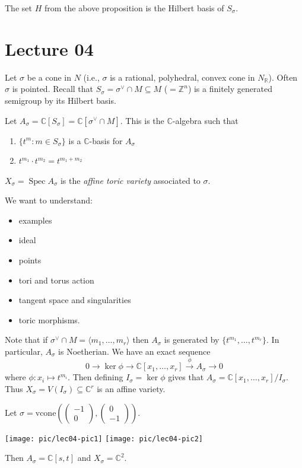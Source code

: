\documentclass[a4paper,12pt]{amsart}
\newcommand{\CC}{\mathbb{C}}
\DeclareMathOperator{\Spec}{Spec}
\begin{document}
The set $H$ from the above proposition is the Hilbert basis of $S_\sigma$.

\newpage
\section{Lecture 04}

Let $\sigma$ be a cone in $N$ (i.e., $\sigma$ is a rational, polyhedral, convex cone in $N_\mathbb{R}$).
Often $\sigma$ is pointed.
Recall that $S_\sigma = \sigma^\vee \cap M \subseteq M$ ($= \mathbb{Z}^n$) is a finitely generated semigroup by its Hilbert basis.

\begin{Def}
Let $A_\sigma = \CC[S_\sigma] = \CC[\sigma^\vee \cap M]$.
This is the $\CC$-algebra such that
\begin{enumerate}
\item $\{t^m : m \in S_\sigma\}$ is a $\CC$-basis for $A_\sigma$
\item $t^{m_1} \cdot t^{m_2} = t^{m_1 + m_2}$
\end{enumerate}
\end{Def}

\begin{Def}
$X_\sigma = \Spec A_\sigma$ is the \emph{affine toric variety} associated to $\sigma$.
\end{Def}

We want to understand:
\begin{itemize}
\item examples
\item ideal
\item points
\item tori and torus action
\item tangent space and singularities
\item toric morphisms.
\end{itemize}

Note that if $\sigma^\vee \cap M = \langle m_1, \dots, m_r \rangle$ then $A_\sigma$ is generated by $\{t^{m_1}, \dots, t^{m_r}\}$.
In particular, $A_\sigma$ is Noetherian.
We have an exact sequence
\[
0 \to \ker \phi \to \CC[x_1, \dots, x_r] \overset{\phi}{\to} A_\sigma \to 0
\]
where $\phi: x_i \mapsto t^{m_i}$.
Then defining $I_\sigma = \ker \phi$ gives that $A_\sigma = \CC[x_1, \dots, x_r]/I_\sigma$.
Thus $X_\sigma = V(I_\sigma) \subseteq \CC^r$ is an affine variety.

\begin{Eg}
Let $\sigma = \mathrm{vcone}\left(\begin{pmatrix}-1\\0\end{pmatrix}, \begin{pmatrix}0\\-1\end{pmatrix}\right)$.

\texttt{[image: pic/lec04-pic1]}
\texttt{[image: pic/lec04-pic2]}

Then $A_\sigma = \CC[s, t]$ and $X_\sigma = \CC^2$.
\end{Eg}
\end{document}

